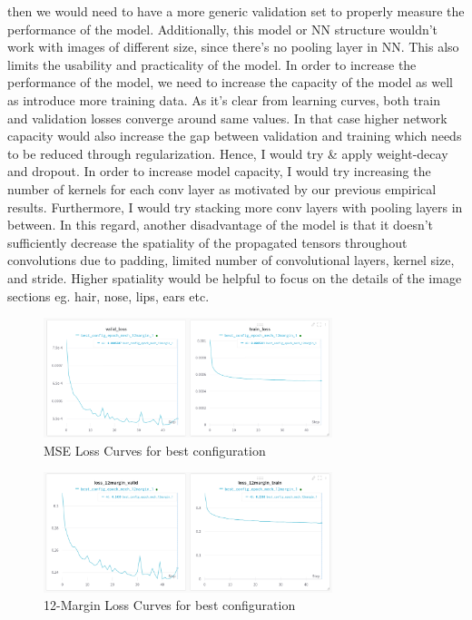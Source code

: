 \documentclass[12pt]{article}
\begin{document}
\begin{center}
        then we would need to have a more generic validation set to properly measure the performance of the model.
        Additionally, this model or NN structure wouldn't work with images of different size, since there's no pooling layer in NN.
        This also limits the usability and practicality of the model.
        In order to increase the performance of the model, we need to increase the capacity of the model as well
        as introduce more training data. As it's clear from learning curves, both train and validation 
        losses converge around same values. In that case higher network capacity would also increase the gap between validation and training which
        needs to be reduced through regularization. Hence, I would try \& apply weight-decay and dropout.
        In order to increase model capacity, I would try increasing the number of kernels for each conv layer as
        motivated by our previous empirical results. Furthermore, I would try stacking more conv layers with pooling layers in between.
        In this regard, another disadvantage of the model is that it doesn't sufficiently decrease the spatiality of the propagated tensors throughout convolutions due to padding, limited number of convolutional layers, kernel size, and stride. 
        Higher spatiality would be helpful to focus on the details of the image sections eg. hair, nose, lips, ears etc.
    \end{center}

    \begin{figure}[!htb]
        \centering
        \includegraphics[width=0.75\textwidth]{figures/best_config_loss_mse.png}
        \caption{MSE Loss Curves for best configuration}
        \label{fig:part-3_best_config_mse_loss}
    \end{figure}
    
    \begin{figure}[!htb]
        \centering
        \includegraphics[width=0.75\textwidth]{figures/best_config_loss_12margin.png}
        \caption{12-Margin Loss Curves for best configuration}
        \label{fig:part-3_best_config_12margin_loss}
    \end{figure}
\end{document}
